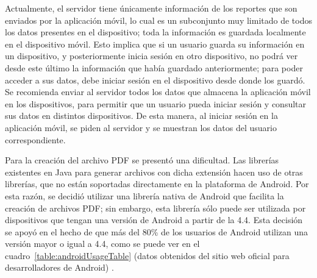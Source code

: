 Actualmente, el servidor tiene únicamente información de los reportes que son enviados por la aplicación móvil, lo cual es un subconjunto muy limitado de todos los datos presentes en el dispositivo; toda la información es guardada localmente en el dispositivo móvil. Esto implica que si un usuario guarda su información en un dispositivo, y posteriormente inicia sesión en otro dispositivo, no podrá ver desde este último la información que había guardado anteriormente; para poder acceder a sus datos, debe iniciar sesión en el dispositivo desde donde los guardó. Se recomienda enviar al servidor todos los datos que almacena la aplicación móvil en los dispositivos, para permitir que un usuario pueda iniciar sesión y consultar sus datos en distintos dispositivos. De esta manera, al iniciar sesión en la aplicación móvil, se piden al servidor y se muestran los datos del usuario correspondiente. 


Para la creación del archivo PDF se presentó una dificultad. Las librerías existentes en Java para generar archivos con dicha extensión hacen uso de otras librerías, que no están soportadas directamente en la plataforma de Android. Por esta razón, se decidió utilizar una librería nativa de Android que facilita la creación de archivos PDF; sin embargo, esta librería sólo puede ser utilizada por dispositivos que tengan una versión de Android a partir de la 4.4. Esta decisión se apoyó en el hecho de que más del 80\% de los usuarios de Android utilizan una versión mayor o igual a 4.4, como se puede ver en el cuadro~\ref{table:androidUsageTable} (datos obtenidos del sitio web oficial para desarrolladores de Android) \cite{USG1}. 

